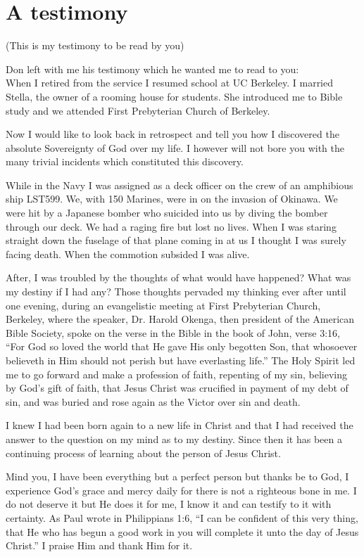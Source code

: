 \documentclass{article}
\begin{document}
\section{A testimony}
(This is my testimony to be read by you)

Don left with me his testimony which he wanted me to read to you:\\

When I retired from the service I resumed school at UC Berkeley.
I married Stella, the owner of a rooming house for students.
She introduced me to Bible study and
    we attended First Prebyterian Church of Berkeley.

Now I would like to look back in retrospect and
    tell you how I discovered the absolute Sovereignty of God over my life.
I however will not bore you with the many trivial incidents 
    which constituted this discovery.

While in the Navy I was assigned as a deck officer on the crew 
    of an amphibious ship LST599.
We, with 150 Marines, were in on the invasion of Okinawa.
We were hit by a Japanese bomber who suicided into us by diving the bomber
    through our deck.
We had a raging fire but lost no lives.
When I was staring straight down the fuselage of that plane
    coming in at us I thought I was surely facing death.
When the commotion subsided I was alive.

After, I was troubled by the thoughts of what would have happened?
What was my destiny if I had any?
Those thoughts pervaded my thinking ever after until one evening,
    during an evangelistic meeting at First Prebyterian Church, Berkeley,
    where the speaker, Dr. Harold Okenga, 
    then president of the American Bible Society,
    spoke on the verse in the Bible in the book of John, verse 3:16,
    ``For God so loved the world that He gave His only begotten Son,
    that whosoever believeth in Him should not perish 
    but have everlasting life.''
The Holy Spirit led me to go forward and make a profession of faith,
    repenting of my sin,
    believing by God's gift of faith,
    that Jesus Christ was crucified in payment of my debt of sin,
    and was buried and rose again as the Victor over sin and death.

I knew I had been born again to a new life in Christ 
    and that I had received the answer to the question on my mind 
    as to my destiny.
Since then it has been a continuing process of learning 
    about the person of Jesus Christ.

Mind you, I have been everything but a perfect person
    but thanks be to God,
    I experience God's grace and mercy daily 
    for there is not a righteous bone in me.
I do not deserve it but He does it for me,
I know it and can testify to it with certainty.
As Paul wrote in Philippians 1:6,
    ``I can be confident of this very thing,
    that He who has begun a good work in you
    will complete it unto the day of Jesus Christ.''
I praise Him and thank Him for it.
\end{document}
